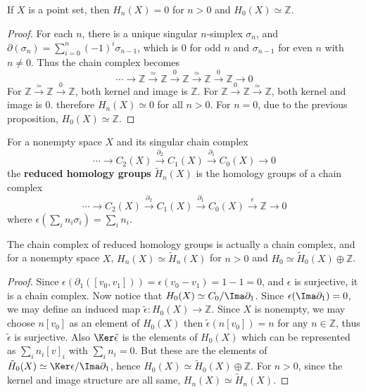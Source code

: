 \begin{prop} If $X$ is a point set, then $H_n(X)=0$ for $n>0$ and $H_0(X)\simeq \mathbb{Z}$.
\end{prop}
\begin{proof} For each $n$, there is a unique singular $n$-simplex $\sigma_n$, and $\partial(\sigma_n)=\sum_{i=0}^{n}(-1)^i\sigma_{n-1}$, which is $0$ for odd $n$ and $\sigma_{n-1}$ for even $n$ with $n\neq 0$. Thus the chain complex becomes
\begin{equation}
\cdots\rightarrow \mathbb{Z}\xrightarrow{\simeq}\mathbb{Z}\xrightarrow{0}\mathbb{Z}\xrightarrow{\simeq}\mathbb{Z}\xrightarrow{0}\mathbb{Z}\rightarrow 0
\end{equation}
For $\mathbb{Z}\xrightarrow{\simeq} \mathbb{Z}\xrightarrow{0} \mathbb{Z}$, both kernel and image is $\mathbb{Z}$. For $\mathbb{Z}\xrightarrow{0}\mathbb{Z}\xrightarrow{\simeq}\mathbb{Z}$, both kernel and image is $0$. therefore $H_n(X)\simeq 0$ for all $n>0$. For $n=0$, due to the previous proposition, $H_0(X)\simeq \mathbb{Z}$.
\end{proof}

\begin{defn} For a nonempty space $X$ and its singular chain complex
\begin{equation}
\cdots \rightarrow C_2(X)\xrightarrow{\partial_2} C_1(X)\xrightarrow{\partial_1} C_0(X)\rightarrow 0
\end{equation}
the \textbf{reduced homology groups} $\tilde{H}_n(X)$ is the homology groups of a chain complex
\begin{equation}
\cdots \rightarrow C_2(X)\xrightarrow{\partial_2} C_1(X)\xrightarrow{\partial_1} C_0(X)\xrightarrow{\epsilon}\mathbb{Z}\rightarrow 0
\end{equation}
where $\epsilon(\sum_i n_i\sigma_i)=\sum_i n_i$.
\end{defn}

\begin{prop} The chain complex of reduced homology groups is actually a chain complex, and for a nonempty space $X$, $H_n(X)\simeq \tilde{H}_n(X)$ for $n>0$ and $H_0\simeq \tilde{H}_0(X)\oplus \mathbb{Z}$.
\end{prop}
\begin{proof}
Since $\epsilon(\partial_1([v_0,v_1]))=\epsilon(v_0-v_1)=1-1=0$, and $\epsilon$ is surjective, it is a chain complex. Now notice that $H_0(X)\simeq C_0/\Ima \partial_1$. Since $\epsilon(\Ima \partial_1)=0$, we may define an induced map $\tilde{\epsilon}:H_0(X)\rightarrow \mathbb{Z}$. Since $X$ is nonempty, we may choose $n[v_0]$ as an element of $H_0(X)$ then $\tilde{\epsilon}(n[v_0])=n$ for any $n\in \mathbb{Z}$, thus $\tilde{\epsilon}$ is surjective. Also $\Ker\tilde{\epsilon}$ is the elements of $H_0(X)$ which can be represented as $\sum_i n_i[v]_i$ with $\sum_i n_i=0$. But these are the elements of $\tilde{H}_0(X)\simeq \Ker\epsilon/\Ima\partial_1$, hence $H_0(X)\simeq \tilde{H}_0(X)\oplus \mathbb{Z}$. For $n>0$, since the kernel and image structure are all same, $H_n(X)\simeq \tilde{H}_n(X)$.
\end{proof}

